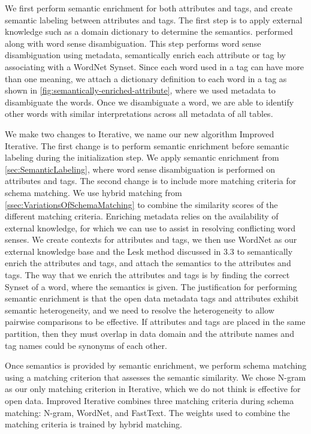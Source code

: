 We first perform semantic enrichment for both attributes and tags, and create semantic labeling between attributes and tags.
The first step is to apply external knowledge such as a domain dictionary to determine the semantics.
performed along with word sense disambiguation.
This step performs word sense disambiguation using metadata, semantically enrich each attribute or tag by associating with a WordNet Synset.
Since each word used in a tag can have more than one meaning, we attach a dictionary definition to each word in a tag as shown in \autoref{fig:semantically-enriched-attribute}, where we used metadata to disambiguate the words.
Once we disambiguate a word, we are able to identify other words with similar interpretations across all metadata of all tables.

We make two changes to Iterative, we name our new algorithm Improved Iterative. The first change is to perform semantic enrichment before semantic labeling during the initialization step. We apply semantic enrichment from \autoref{sec:SemanticLabeling}, where word sense disambiguation is performed on attributes and tags. The second change is to include more matching criteria for schema matching. We use hybrid matching from \autoref{ssec:VariationsOfSchemaMatching} to combine the similarity scores of the different matching criteria.
Enriching metadata relies on the availability of external knowledge, for which we can use to assist in resolving conflicting word senses. We create contexts for attributes and tags, we then use WordNet as our external knowledge base and the Lesk method discussed in 3.3 to semantically enrich the attributes and tags, and attach the semantics to the attributes and tags. The way that we enrich the attributes and tags is by finding the correct Synset of a word, where the semantics is given. The justification for performing semantic enrichment is that the open data metadata tags and attributes exhibit semantic heterogeneity, and we need to resolve the heterogeneity to allow pairwise comparisons to be effective. If attributes and tags are placed in the same partition, then they must overlap in data domain and the attribute names and tag names could be synonyms of each other.

Once semantics is provided by semantic enrichment, we perform schema matching using a matching criterion that assesses the semantic similarity. We chose N-gram as our only matching criterion in Iterative, which we do not think is effective for open data. Improved Iterative combines three matching criteria during schema matching: N-gram, WordNet, and FastText. The weights used to combine the matching criteria is trained by hybrid matching.

